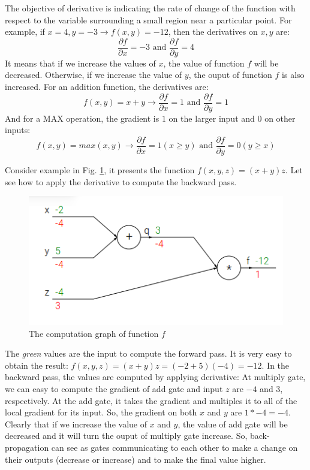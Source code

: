 The objective of derivative is indicating the rate of change of the function with respect to the variable surrounding a small region near a particular point. For example, if $x = 4, y = -3 \rightarrow f(x,y) = -12$, then the derivatives on $x, y$ are:
\begin{equation}
	\frac{\partial f}{\partial x} = -3 \text{ and } \frac{\partial f}{\partial y} = 4
\end{equation}
It means that if we increase the values of $x$, the value of function $f$ will be decreased. Otherwise, if we increase the value of $y$, the ouput of function $f$ is also increased.
For an addition function, the derivatives are:
\begin{equation}
	f(x,y) = x + y \rightarrow \frac{\partial f}{\partial x} = 1 \text{ and } \frac{\partial f}{\partial y} = 1
\end{equation}
And for a MAX operation, the gradient is $1$ on the larger input and $0$ on other inputs:
\begin{equation}
	f(x,y) = max(x,y) \rightarrow \frac{\partial f}{\partial x} = 1 (x \geq y) \text{ and } \frac{\partial f}{\partial y} = 0 (y \geq x)
\end{equation}

Consider example in Fig. \ref{figbackex1}, it presents the function $f(x,y,z) = (x + y)z$. Let see how to apply the derivative to compute the backward pass.

\begin{figure}[h]
	\centering
	\includegraphics[scale=0.6]{images/back_ex}
	\caption{The computation graph of function $f$}
	\label{figbackex1}
\end{figure}
The \textit{green} values are the input to compute the forward pass. It is very easy to obtain the result: $f(x,y,z) = (x +y)z = (-2 + 5)(-4) = -12$. In the backward pass, the values are computed by applying derivative: At multiply gate, we can easy to compute the gradient of add gate and input $z$ are $-4$ and $3$, respectively. At the add gate, it takes the gradient and multiples it to all of the local gradient for its input. So, the gradient on both $x$ and $y$ are $1 \ast -4 = -4$. Clearly that if we increase the value of $x$ and $y$, the value of add gate will be decreased and it will turn the ouput of multiply gate increase. So, back-propagation can see as gates communicating to each other to make a change on their outputs (decrease or increase) and to make the final value higher.


